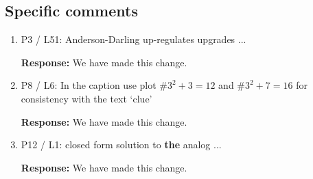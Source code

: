 \documentclass{article}
\newcommand{\red}[1]{{\color{red} #1}}
\begin{document}
\subsection*{Specific comments}

\begin{enumerate}
\item P3 / L51: Anderson-Darling \red{up-regulates} upgrades ...

\textbf{Response:} We have made this change.

\item P8 / L6: In the caption use plot \#$3^2+3=12$ and \#$3^2+7=16$ for consistency with the text `clue'

\textbf{Response:} We have made this change.

\item P12 / L1: closed form solution to \textbf{the} analog ...

\textbf{Response:} We have made this change.

\end{enumerate}
\end{document}

